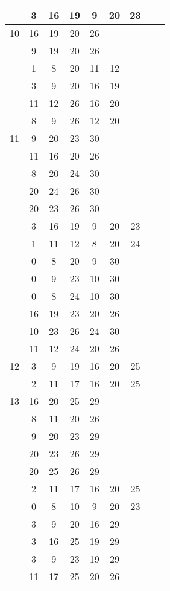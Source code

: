 \begin{table}[H]
\begin{tabular}{|c|cccccccc|}
 & 3 & 16 & 19 & 9 & 20 & 23 &   &  \\
\hline
10  & 16 & 19 & 20 & 26 &   &   &   &  \\
 & 9 & 19 & 20 & 26 &   &   &   &  \\
 & 1 & 8 & 20 & 11 & 12 &   &   &  \\
 & 3 & 9 & 20 & 16 & 19 &   &   &  \\
 & 11 & 12 & 26 & 16 & 20 &   &   &  \\
 & 8 & 9 & 26 & 12 & 20 &   &   &  \\
\hline
11  & 9 & 20 & 23 & 30 &   &   &   &  \\
 & 11 & 16 & 20 & 26 &   &   &   &  \\
 & 8 & 20 & 24 & 30 &   &   &   &  \\
 & 20 & 24 & 26 & 30 &   &   &   &  \\
 & 20 & 23 & 26 & 30 &   &   &   &  \\
 & 3 & 16 & 19 & 9 & 20 & 23 &   &  \\
 & 1 & 11 & 12 & 8 & 20 & 24 &   &  \\
 & 0 & 8 & 20 & 9 & 30 &   &   &  \\
 & 0 & 9 & 23 & 10 & 30 &   &   &  \\
 & 0 & 8 & 24 & 10 & 30 &   &   &  \\
 & 16 & 19 & 23 & 20 & 26 &   &   &  \\
 & 10 & 23 & 26 & 24 & 30 &   &   &  \\
 & 11 & 12 & 24 & 20 & 26 &   &   &  \\
\hline
12  & 3 & 9 & 19 & 16 & 20 & 25 &   &  \\
 & 2 & 11 & 17 & 16 & 20 & 25 &   &  \\
\hline
13  & 16 & 20 & 25 & 29 &   &   &   &  \\
 & 8 & 11 & 20 & 26 &   &   &   &  \\
 & 9 & 20 & 23 & 29 &   &   &   &  \\
 & 20 & 23 & 26 & 29 &   &   &   &  \\
 & 20 & 25 & 26 & 29 &   &   &   &  \\
 & 2 & 11 & 17 & 16 & 20 & 25 &   &  \\
 & 0 & 8 & 10 & 9 & 20 & 23 &   &  \\
 & 3 & 9 & 20 & 16 & 29 &   &   &  \\
 & 3 & 16 & 25 & 19 & 29 &   &   &  \\
 & 3 & 9 & 23 & 19 & 29 &   &   &  \\
 & 11 & 17 & 25 & 20 & 26 &   &   &  \\

\end{tabular}
\end{table}
